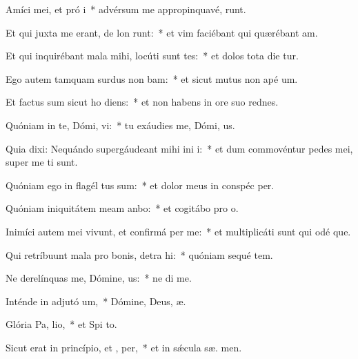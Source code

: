 \item Amíci mei, et pró i~* advérsum me appropinquavé,  runt.
\item Et qui juxta me erant, de lon runt:~* et vim faciébant qui quærébant  am.
\item Et qui inquirébant mala mihi, locúti sunt tes:~* et dolos tota die tur.
\item Ego autem tamquam surdus non bam:~* et sicut mutus non apé  um.
\item Et factus sum sicut ho  diens:~* et non habens in ore suo rednes.
\item Quóniam in te, Dómi, vi:~* tu exáudies me, Dómi,  us.
\item Quia dixi: Nequándo supergáudeant mihi ini i:~* et dum commovéntur pedes mei, super me  ti sunt.
\item Quóniam ego in flagél tus sum:~* et dolor meus in conspéc  per.
\item Quóniam iniquitátem meam anbo:~* et cogitábo pro  o.
\item Inimíci autem mei vivunt, et confirmá  per me:~* et multiplicáti sunt qui odé  que.
\item Qui retríbuunt mala pro bonis, detra hi:~* quóniam sequé tem.
\item Ne derelínquas me, Dómine,  us:~* ne di  me.
\item Inténde in adjutó um,~* Dómine, Deus,  æ.
\item Glória Pa,  lio,~* et Spi to.
\item Sicut erat in princípio, et ,  per,~* et in sǽcula sæ. men.
